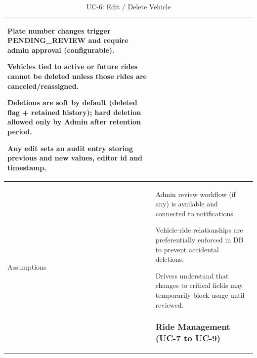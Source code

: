 \begin{longtable}{|p{3.5cm}|p{12cm}|}
Plate number changes trigger PENDING\_REVIEW and require admin approval (configurable).

Vehicles tied to active or future rides cannot be deleted unless those rides are canceled/reassigned.

Deletions are soft by default (deleted flag + retained history); hard deletion allowed only by Admin after retention period.

Any edit sets an audit entry storing previous and new values, editor id and timestamp. \\
\hline
Assumptions &
Admin review workflow (if any) is available and connected to notifications.

Vehicle-ride relationships are preferentially enforced in DB to prevent accidental deletions.

Drivers understand that changes to critical fields may temporarily block usage until reviewed.

\subsubsection{Ride Management (UC-7 to UC-9)}
\hline
\caption{UC-6: Edit / Delete Vehicle}
\end{longtable}

